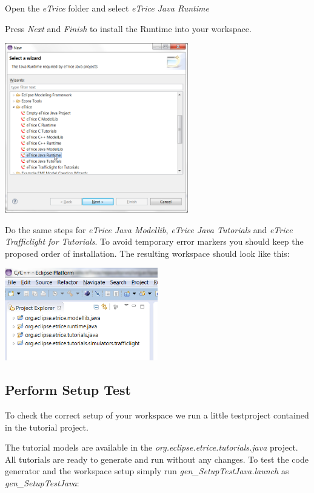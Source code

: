 Open the \emph{eTrice} folder and select \textit{eTrice Java Runtime}

Press \emph{Next} and \emph{Finish} to install the Runtime into your workspace.

\includegraphics[width=0.6\textwidth]{images/013-SetupWorkspace03.png}

Do the same steps for \textit{eTrice Java Modellib}, \textit{eTrice Java Tutorials} and \textit{eTrice Trafficlight for Tutorials}. To avoid temporary 
error markers you should keep the proposed order of installation. The resulting workspace should look like 
this:

\includegraphics[width=0.5\textwidth]{images/013-SetupWorkspace04.png}

\subsection{Perform Setup Test}

To check the correct setup of your workspace we run a little testproject contained in the tutorial project.

The tutorial models are available in the \textit{org.eclipse.etrice.tutorials.java} project. All tutorials are 
ready to generate and run without any changes. To test the code generator and the workspace setup simply run 
\emph{gen\_SetupTestJava.launch} as \emph{gen\_SetupTestJava}: 

